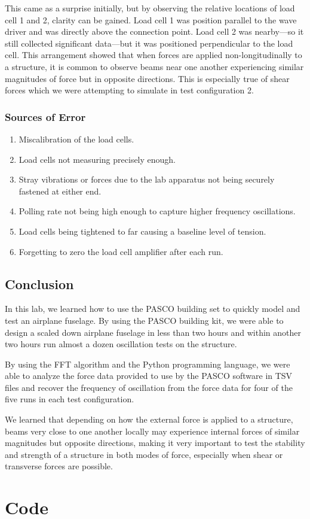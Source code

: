 \documentclass[12 pt]{report}
\begin{document}
This came as a surprise initially, but by observing the relative locations of load cell \num{1} and \num{2}, clarity can be gained. Load cell \num{1} was position parallel to the wave driver and was directly above the connection point. Load cell \num{2} was nearby---so it still collected significant data---but it was positioned perpendicular to the load cell. This arrangement showed that when forces are applied non-longitudinally to a structure, it is common to observe beams near one another experiencing similar magnitudes of force but in opposite directions. This is especially true of shear forces which we were attempting to simulate in test configuration \num{2}.

\subsection{Sources of Error} \label{sources_of_error}
\begin{enumerate}
	\item Miscalibration of the load cells.
	\item Load cells not measuring precisely enough.
	\item Stray vibrations or forces due to the lab apparatus not being securely fastened at either end.
	\item Polling rate not being high enough to capture higher frequency oscillations.
	\item Load cells being tightened to far causing a baseline level of tension.
	\item Forgetting to zero the load cell amplifier after each run.
\end{enumerate}

\section{Conclusion} \label{conclusion-section}
In this lab, we learned how to use the PASCO building set to quickly model and test an airplane fuselage. By using the PASCO building kit, we were able to design a scaled down airplane fuselage in less than two hours and within another two hours run almost a dozen oscillation tests on the structure.

By using the FFT algorithm and the Python programming language, we were able to analyze the force data provided to use by the PASCO software in TSV files and recover the frequency of oscillation from the force data for four of the five runs in each test configuration.

We learned that depending on how the external force is applied to a structure, beams very close to one another locally may experience internal forces of similar magnitudes but opposite directions, making it very important to test the stability and strength of a structure in both modes of force, especially when shear or transverse forces are possible.

\printbibliography[heading=subbibintoc]
\appendix
\chapter{Code} \label{code}

\end{document}
